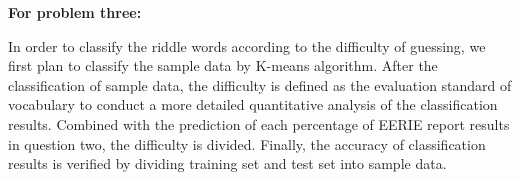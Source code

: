 \documentclass{mcmthesis}
\begin{document}
\textbf {For problem three:}

In order to classify the riddle words according to the difficulty of guessing, we first plan to classify the sample data by K-means algorithm. After the classification of sample data, the difficulty is defined as the evaluation standard of vocabulary to conduct a more detailed quantitative analysis of the classification results. Combined with the prediction of each percentage of EERIE report results in question two, the difficulty is divided. Finally, the accuracy of classification results is verified by dividing training set and test set into sample data.


%
%		
%
\end{document}
